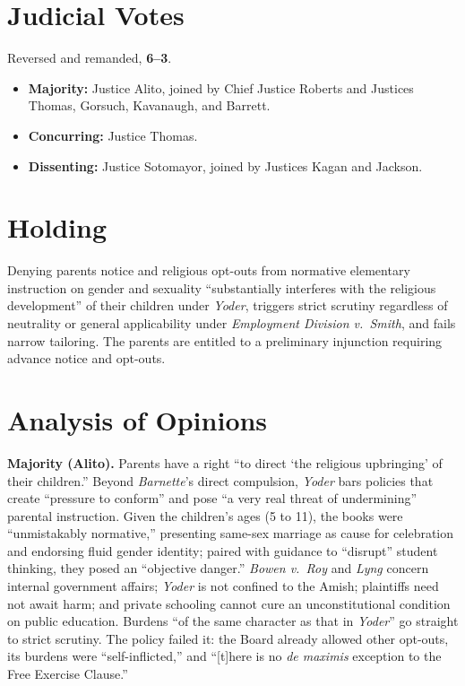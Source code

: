 \documentclass[12pt]{article}
\begin{document}
\section{Judicial Votes}

Reversed and remanded, \textbf{6--3}.
\begin{itemize}
\item \textbf{Majority:} Justice Alito, joined by Chief Justice Roberts and Justices Thomas, Gorsuch, Kavanaugh, and Barrett.
\item \textbf{Concurring:} Justice Thomas.
\item \textbf{Dissenting:} Justice Sotomayor, joined by Justices Kagan and Jackson.
\end{itemize}

\section{Holding}

Denying parents notice and religious opt-outs from normative elementary instruction on gender and sexuality ``substantially interferes with the religious development'' of their children under \textit{Yoder}, triggers strict scrutiny regardless of neutrality or general applicability under \textit{Employment Division v.\ Smith}, and fails narrow tailoring. The parents are entitled to a preliminary injunction requiring advance notice and opt-outs.

\section{Analysis of Opinions}

\textbf{Majority (Alito).} Parents have a right ``to direct `the religious upbringing' of their children.'' Beyond \textit{Barnette}'s direct compulsion, \textit{Yoder} bars policies that create ``pressure to conform'' and pose ``a very real threat of undermining'' parental instruction. Given the children's ages (5 to 11), the books were ``unmistakably normative,'' presenting same-sex marriage as cause for celebration and endorsing fluid gender identity; paired with guidance to ``disrupt'' student thinking, they posed an ``objective danger.'' \textit{Bowen v.\ Roy} and \textit{Lyng} concern internal government affairs; \textit{Yoder} is not confined to the Amish; plaintiffs need not await harm; and private schooling cannot cure an unconstitutional condition on public education. Burdens ``of the same character as that in \textit{Yoder}'' go straight to strict scrutiny. The policy failed it: the Board already allowed other opt-outs, its burdens were ``self-inflicted,'' and ``[t]here is no \textit{de maximis} exception to the Free Exercise Clause.''
\end{document}
